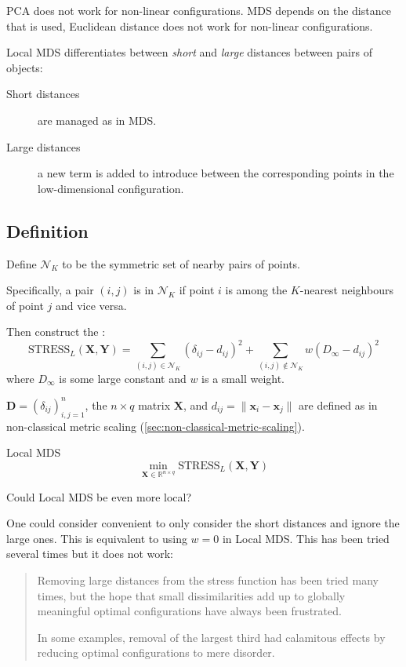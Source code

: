 PCA does not work for non-linear configurations. MDS depends on the distance that is
used, Euclidean distance does not work for non-linear configurations.

\begin{note}
	Local MDS differentiates between \emph{short} and \emph{large} distances between
	pairs of objects:
	\begin{description}
		\item[Short distances] are managed as in MDS.
		\item[Large distances] a new term is added to introduce  between the
			corresponding points in the low-dimensional configuration.
	\end{description}
\end{note}

\subsection{Definition}

Define $\mathcal N_K$ to be the symmetric set of nearby pairs of points.

Specifically, a pair $(i, j)$ is in $\mathcal N_K$ if point $i$ is among the $K$-nearest
neighbours of point $j$ and vice versa.

Then construct the :
\begin{equation*}
	\text{STRESS}_L(\boldsymbol X, \boldsymbol Y) = \sum_{(i, j) \in \mathcal N_K} (\delta_{ij} - d_{ij})^2
	+ \sum_{(i, j) \notin \mathcal N_K} w(D_\infty - d_{ij})^2
\end{equation*}
where $D_\infty$ is some large constant and $w$ is a small weight.

$\boldsymbol D = (\delta_{ij})^n_{i,j=1}$, the $n \times q$ matrix $\boldsymbol X$, and
$d_{ij} = \lVert \boldsymbol x_i - \boldsymbol x_j \rVert$ are defined as in non-classical
metric scaling (\cref{sec:non-classical-metric-scaling}).

\begin{problem}{Local MDS}{}
\begin{equation*}
	\min_{\boldsymbol X \in \mathds{R}^{n \times q}} \text{STRESS}_L(\boldsymbol X, \boldsymbol Y)
\end{equation*}
\end{problem}

\begin{question}{Could Local MDS be even more local?}{}

	One could consider convenient to only consider the short distances and ignore
	the large ones. This is equivalent to using $w = 0$ in Local MDS. This has been
	tried several times but it does not work:
	\begin{quote}
		Removing large distances from the stress function has been tried
		many times, but the hope that small dissimilarities add up to globally
		meaningful optimal configurations have always been frustrated.

		In some examples, removal of the largest third had calamitous
		effects by reducing optimal configurations to mere disorder.
	\end{quote}
\end{question}

